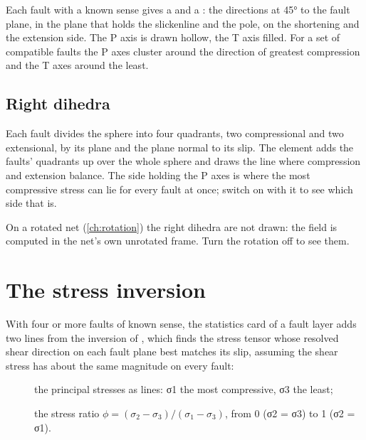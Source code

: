 Each fault with a known sense gives a  and a : the directions at 45° to the
fault plane, in the plane that holds the slickenline and the pole, on the shortening and the extension
side. The P axis is drawn hollow, the T axis filled. For a set of compatible faults the P axes cluster
around the direction of greatest compression and the T axes around the least.

\subsection{Right dihedra}\label{sec:dihedra}


Each fault divides the sphere into four quadrants, two compressional and two extensional, by its plane
and the plane normal to its slip. The  element adds the faults' quadrants up over the
whole sphere and draws the line where compression and extension balance. The side holding the P axes is
where the most compressive stress can lie for every fault at once; switch  on with it to
see which side that is.

\begin{caution}
On a rotated net (\cref{ch:rotation}) the right dihedra are not drawn: the field is computed in the
net's own unrotated frame. Turn the rotation off to see them.
\end{caution}

\section{The stress inversion}\label{sec:stress}

With four or more faults of known sense, the statistics card of a fault layer adds two lines from
the inversion of \textcite{michael1984}, which finds the stress tensor whose resolved shear direction on each
fault plane best matches its slip, assuming the shear stress has about the same magnitude on every fault:

\begin{description}
\item[] the principal stresses as lines: σ1 the most compressive, σ3 the least;
\item[] the stress ratio $\phi = (\sigma_2 - \sigma_3)/(\sigma_1 - \sigma_3)$, from 0 (σ2 = σ3) to 1
(σ2 = σ1).
\end{description}

